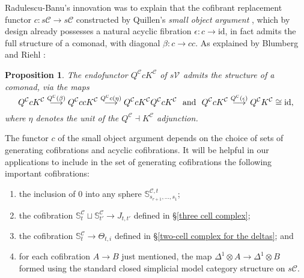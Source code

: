 \documentclass[11pt]{amsart} \renewcommand{\baselinestretch}{1.2}
\theoremstyle{plain}
\newtheorem{prop}[thm]{Proposition}
\numberwithin{equation}{section} %
\theoremstyle{plain}
\newtheorem{prop}[thm]{Proposition}
\numberwithin{equation}{chapter} %
\renewcommand{\to}{\longrightarrow}
\newcommand{\squishlist}{
}
\newcommand{\calV}{\mathcal{V}}
\newcommand{\calc}{\mathcal{C}}
\newcommand{\citeBOX}[2][]{\cite[\mbox{#1}]{#2}}
\newcommand{\vect}[2]{\calV^{#1}_{#2}}
\newcommand{\Id}{\mathrm{id}}
\begin{document}
\begin{Pi-algebras and cohomology algebras}
Radulescu-Banu's innovation \cite{Radulescu-Banu.pdf} was to explain that the cofibrant replacement functor $c:s\calc\to s\calc$ constructed by Quillen's \emph{small object argument}  \cite{QuillenHomAlg.pdf}, which by design already possesses a natural acyclic fibration $\epsilon:c\to\Id$, in fact admits the full structure of a comonad, with diagonal $\beta:c\to cc$. As explained by Blumberg and Riehl \cite[Remark 4.12]{BlumRiehlResolutions.pdf}:
\begin{prop}
\label{QcK is a comonad}
The endofunctor $Q^\calc cK^\calc$ of $s\vect{}{}$ admits the structure of a comonad, via the maps
\[Q^\calc cK^\calc\overset{\smash{Q^\calc (\beta)}}{\to}Q^\calc ccK^\calc \overset{\smash{Q^\calc c(\eta)}}{\to} Q^\calc cK^\calc Q^\calc cK^\calc\text{ \ and \ }Q^\calc cK^\calc\overset{\smash{Q^\calc (\epsilon)}}{\to}Q^\calc K^\calc\cong\Id,\]
where $\eta$ denotes the unit of the $Q^\calc\dashv K^\calc$ adjunction.
\end{prop}

The functor $c$ of the small object argument depends on the choice of sets of generating cofibrations and acyclic cofibrations. It will be helpful in our applications to include in the set of generating cofibrations the following important cofibrations:
\begin{enumerate}\squishlist
\item the inclusion of $0$ into any sphere $\mathbb{S}^{\calc,t}_{s_{r+1},\ldots,s_1}$;
\item the cofibration $\mathbb{S}^{\calc}_t\sqcup \mathbb{S}^{\calc}_{t'}\to J_{t,t'}$  defined in \S\ref{three cell complex};
\item the cofibration 
$\mathbb{S}^{\calc}_t\to\Theta_{t,i}$ defined in \S\ref{two-cell complex for the deltas}; and
\item for each cofibration $A\to B$ just mentioned, the map $\Delta^1\otimes A\to \Delta^1\otimes B$ formed using the standard closed simplicial  model category structure \citeBOX[II.4]{QuillenHomAlg.pdf} on $s\calc$.
\end{enumerate}



\end{Pi-algebras and cohomology algebras}
\end{document}
